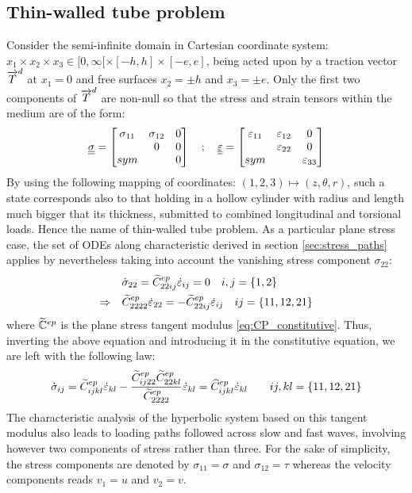 \subsection{Thin-walled tube problem}
\label{sec:num_thin-walled}
Consider the semi-infinite domain in Cartesian coordinate system: $x_1 \times x_2 \times x_3 \in [0,\infty[ \times [-h,h] \times [-e,e]$, being acted upon by a traction vector ${\overrightarrow{T}}^d$ at $x_1=0 $ and free surfaces $x_2=\pm h$ and $x_3=\pm e$.
Only the first two components of ${\overrightarrow{T}}^d$ are non-null so that the stress and strain tensors within the medium are of the form:
\begin{equation}
  {\underline{\underline{\sigma}}} = \left[\begin{matrix}\sigma_{11} & \sigma_{12} & 0\\  & 0 & 0\\sym & & 0\end{matrix}\right] \quad ;\quad{\underline{\underline{\varepsilon}}} = \left[\begin{matrix}\varepsilon_{11} & \varepsilon_{12} &0 \\  & \varepsilon_{22}&0 \\sym & & \varepsilon_{33}\end{matrix}\right]
\end{equation}
By using the following mapping of coordinates: $(1,2,3) \mapsto (z,\theta,r)$, such a state corresponds also to that 
holding in a hollow cylinder with radius and length much bigger that its thickness, submitted to combined longitudinal and torsional loads.
Hence the name of thin-walled tube problem. 
As a particular plane stress case, the set of ODEs along characteristic derived in section \ref{sec:stress_paths} applies by nevertheless taking into account the vanishing stress component $\sigma_{22}$:
\begin{align*}
  & \dot{\sigma}_{22}=\widetilde{C}^{ep}_{22ij} \dot{\varepsilon}_{ij} =0 \quad i,j=\{1,2\} \\
  \Rightarrow  \quad  &\widetilde{C}^{ep}_{2222} \dot{\varepsilon}_{22} = - \widetilde{C}^{ep}_{22ij}\dot{\varepsilon}_{ij} \quad ij=\{11,12,21\}
\end{align*}
where $\widetilde{\mathbb{C}}^{ep}$ is the plane stress tangent modulus \eqref{eq:CP_constitutive}.
Thus, inverting the above equation and introducing it in the constitutive equation, we are left with the following law:
\begin{equation}
  \label{eq:ch5_TW_tangent}
  \dot{\sigma}_{ij}=\widetilde{C}^{ep}_{ijkl} \dot{\varepsilon}_{kl} - \frac{\widetilde{C}^{ep}_{ij22}\widetilde{C}^{ep}_{22kl}}{\widetilde{C}^{ep}_{2222}}\dot{\varepsilon}_{kl}= \widehat{C}^{ep}_{ijkl} \dot{\varepsilon}_{kl}\qquad ij,kl=\{11,12,21\} 
\end{equation}
The characteristic analysis of the hyperbolic system based on this tangent modulus also leads to loading paths followed across slow and fast waves, involving however two components of stress rather than three. For the sake of simplicity, the stress components are denoted by $\sigma_{11}=\sigma$ and $\sigma_{12}=\tau$ whereas the velocity components reads $v_1=u$ and $v_2=v$.


